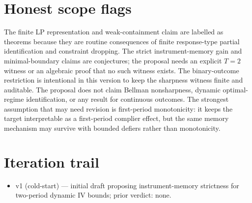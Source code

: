 \documentclass[11pt]{article}
\theoremstyle{definition}
\theoremstyle{plain}
\theoremstyle{remark}
\begin{document}
\section{Honest scope flags}
The finite LP representation and weak-containment claim are labelled as theorems because they are routine consequences of finite response-type partial identification and constraint dropping.  The strict instrument-memory gain and minimal-boundary claims are conjectures; the proposal needs an explicit \(T=2\) witness or an algebraic proof that no such witness exists.  The binary-outcome restriction is intentional in this version to keep the sharpness witness finite and auditable.  The proposal does not claim Bellman nonsharpness, dynamic optimal-regime identification, or any result for continuous outcomes.  The strongest assumption that may need revision is first-period monotonicity: it keeps the target interpretable as a first-period complier effect, but the same memory mechanism may survive with bounded defiers rather than monotonicity.

\section{Iteration trail}
\begin{itemize}[leftmargin=*]
\item v1 (cold-start) --- initial draft proposing instrument-memory strictness for two-period dynamic IV bounds; prior verdict: none.
\end{itemize}
\end{document}

